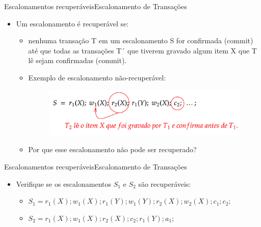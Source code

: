 \documentclass[t]{beamer}
\begin{document}
\begin{ftst}{Escalonamentos recuperáveis}{Escalonamento de Transações}

\begin{itemize}
    \item Um escalonamento é recuperável se:
    \begin{itemize}
        \item nenhuma transação T em um escalonamento S for confirmada (commit) até que todas as transações T´ que tiverem gravado algum item X que T lê sejam confirmadas (commit).
        \item Exemplo de escalonamento não-recuperável:
            \begin{figure}
                \centering
                \includegraphics[scale=0.15]{Figuras_transacoes/20.png}
            \end{figure}
        \item Por que esse escalonamento não pode ser recuperado?
    \end{itemize}
\end{itemize}
\end{ftst}


\begin{ftst}{Escalonamentos recuperáveis}{Escalonamento de Transações}

\begin{itemize}
    \item Verifique se os escalonamentos $S_1$ e $S_2$ são recuperáveis:
    \vone
    \begin{itemize}
        \item $S_1 = r_1(X); w_1(X); r_1(Y); w_1(Y); r_2(X); w_2(X); c_1; c_2;$
        \vone
        \item $S_2 = r_1(X); w_1(X); r_2(X); c_2; r_1(Y); a_1;$
    \end{itemize}
\end{itemize}
\end{ftst}

\end{document}
